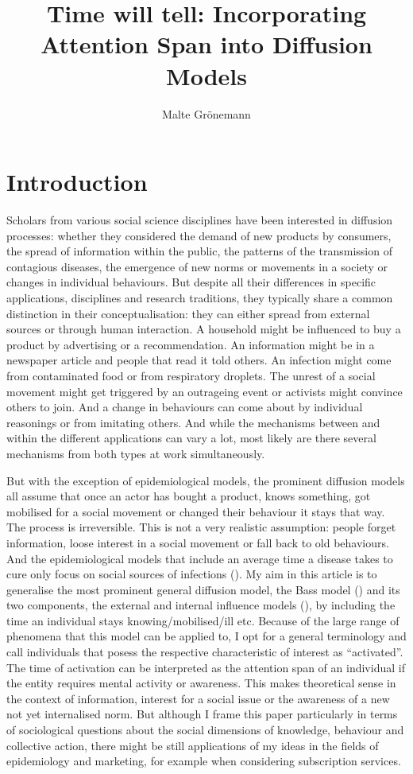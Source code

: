 \documentclass[a4paper,12pt]{article}
\title{Time will tell: Incorporating Attention Span into Diffusion Models}
\author{Malte Grönemann}
\begin{document}
\maketitle

\section{Introduction}

Scholars from various social science disciplines have been interested in diffusion processes: whether they considered the demand of new products by consumers, the spread of information within the public, the patterns of the transmission of contagious diseases, the emergence of new norms or movements in a society or changes in individual behaviours. But despite all their differences in specific applications, disciplines and research traditions, they typically share a common distinction in their conceptualisation: they can either spread from external sources or through human interaction. A household might be influenced to buy a product by advertising or a recommendation. An information might be in a newspaper article and people that read it told others. An infection might come from contaminated food or from respiratory droplets. The unrest of a social movement might get triggered by an outrageing event or activists might convince others to join. And a change in behaviours can come about by individual reasonings or from imitating others. And while the mechanisms between and within the different applications can vary a lot, most likely are there several mechanisms from both types at work simultaneously.

But with the exception of epidemiological models, the prominent diffusion models all assume that once an actor has bought a product, knows something, got mobilised for a social movement or changed their behaviour it stays that way. The process is irreversible. This is not a very realistic assumption: people forget information, loose interest in a social movement or fall back to old behaviours. And the epidemiological models that include an average time a disease takes to cure only focus on social sources of infections (\cite{hethcoteThreeBasicEpidemiological1989}). My aim in this article is to generalise the most prominent general diffusion model, the Bass model (\cite{bassNewProductGrowth1969}) and its two components, the external and internal influence models (\cite{mahajanModelsInnovationDiffusion1985}), by including the time an individual stays knowing/mobilised/ill etc. Because of the large range of phenomena that this model can be applied to, I opt for a general terminology and call individuals that posess the respective characteristic of interest as ``activated''. The time of activation can be interpreted as the attention span of an individual if the entity requires mental activity or awareness. This makes theoretical sense in the context of information, interest for a social issue or the awareness of a new not yet internalised norm. But although I frame this paper particularly in terms of sociological questions about the social dimensions of knowledge, behaviour and collective action, there might be still applications of my ideas in the fields of epidemiology and marketing, for example when considering subscription services.
\end{document}
